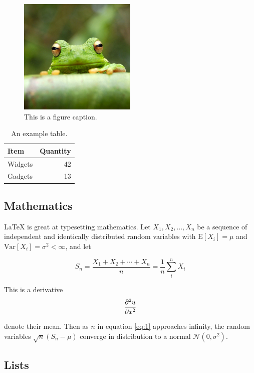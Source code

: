 \begin{figure}
\centering
\includegraphics[width=0.5\textwidth]{frog.jpg}
\caption{\label{fig:frog}This is a figure caption.}
\end{figure}

\begin{table}
\centering
\begin{tabular}{l|r}
Item & Quantity \\\hline
Widgets & 42 \\
Gadgets & 13
\end{tabular}
\caption{\label{tab:widgets}An example table.}
\end{table}

\subsection{Mathematics}

\LaTeX{} is great at typesetting mathematics. Let $X_1, X_2, \ldots, X_n$ be a sequence of independent and identically distributed random variables with $\text{E}[X_i] = \mu$ and $\text{Var}[X_i] = \sigma^2 < \infty$, and let

\begin{equation}\label{eq:1}
S_n = \frac{X_1 + X_2 + \cdots + X_n}{n}
      = \frac{1}{n}\sum_{i}^{n} X_i
\end{equation}

This is a derivative
$$
\dfrac{\partial^2 u}{\partial x^2}
$$

denote their mean. Then as $n$ in equation \eqref{eq:1} approaches infinity, the random variables $\sqrt{n}(S_n - \mu)$ converge in distribution to a normal $\mathcal{N}(0, \sigma^2)$.

\subsection{Lists}

